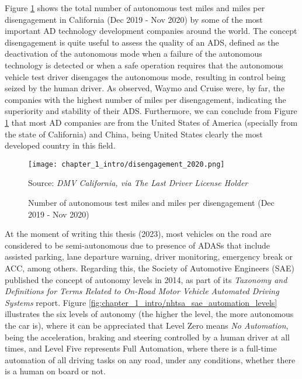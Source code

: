 Figure \ref{fig:chapter_1_intro/disengagement_2020} shows the total number of autonomous test miles and miles per disengagement in California (Dec 2019 - Nov 2020) by some of the most important \ac{AD} technology development companies around the world. The concept disengagement is quite useful to assess the quality of an \ac{ADS}, defined as the deactivation of the autonomous mode when a failure of the autonomous technology is detected or when a safe operation requires that the autonomous vehicle test driver disengages the autonomous mode, resulting in control being seized by the human driver. As observed, Waymo and Cruise were, by far, the companies with the highest number of miles per disengagement, indicating the superiority and stability of their \ac{ADS}. Furthermore, we can conclude from Figure \ref{fig:chapter_1_intro/disengagement_2020} that most \ac{AD} companies are from the United States of America (specially from the state of California) and China, being United States clearly the most developed country in this field.  

\begin{figure}[ht]
	\centering
	\texttt{[image: chapter\_1\_intro/disengagement\_2020.png]}
	\caption{Number of autonomous test miles and miles per disengagement (Dec 2019 - Nov 2020)}
	Source: \textit{DMV California, via The Last Driver License Holder}
	\label{fig:chapter_1_intro/disengagement_2020}
\end{figure}

At the moment of writing this thesis (2023), most vehicles on the road are considered to be semi-autonomous due to presence of \acp{ADAS} that include assisted parking, lane departure warning, driver monitoring, emergency break or \ac{ACC}, among others. Regarding this, the Society of Automotive Engineers (SAE) published the concept of autonomy levels in 2014, as part of its \textit{Taxonomy and Definitions for Terms Related to On-Road Motor Vehicle Automated Driving Systems} \cite{taxonomy2016definitions} report. Figure \ref{fig:chapter_1_intro/nhtsa_sae_automation_levels} illustrates the six levels of autonomy (the higher the level, the more autonomous the car is), where it can be appreciated that Level Zero means \textit{No Automation}, being the acceleration, braking and steering controlled by a human driver at all times, and Level Five represents Full Automation, where there is a full-time automation of all driving tasks on any road, under any conditions, whether there is a human on board or not.

